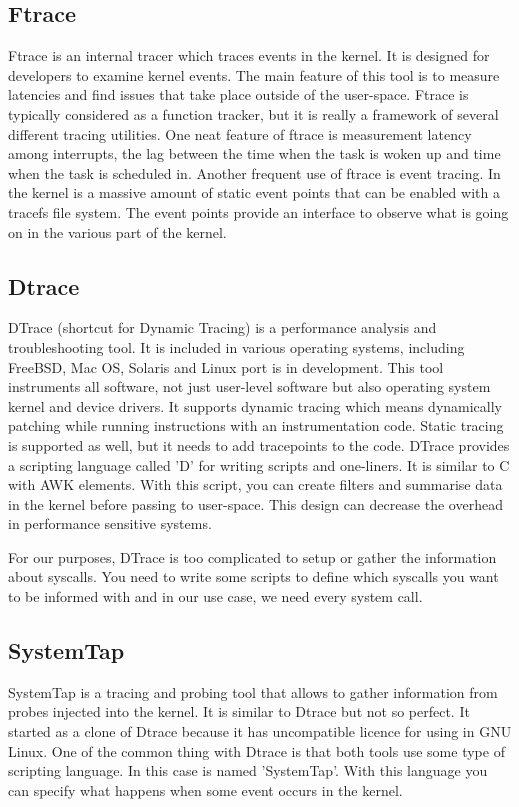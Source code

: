 \subsection{Ftrace}
Ftrace\cite{ftrace_man} is an internal tracer which traces events in the kernel.
It is designed for developers to examine kernel events.
The main feature of this tool is to measure latencies and find issues that take place outside of the user-space.
Ftrace is typically considered as a function tracker,
but it is really a framework of several different tracing utilities.
One neat feature of ftrace is measurement latency among interrupts, the lag between the time when the task is woken up and time when the task is scheduled in.
Another frequent use of ftrace is event tracing.
In the kernel is a massive amount of static event points that can be enabled with a tracefs file system.
The event points provide an interface to observe what is going on in the various part of the kernel.

\subsection{Dtrace}
DTrace\cite{dtrace_man}\cite{dtrace_about} (shortcut for Dynamic Tracing) is a performance analysis and troubleshooting tool.
It is included in various operating systems, including FreeBSD, Mac OS, Solaris and Linux port is in development.
This tool instruments all software, not just user-level software but also operating system kernel and device drivers.
It supports dynamic tracing which means dynamically patching while running instructions with an instrumentation code.
Static tracing is supported as well, but it needs to add tracepoints to the code.
DTrace provides a scripting language called 'D' for writing scripts and one-liners.
It is similar to C with AWK elements.
With this script, you can create filters and summarise data in the kernel before passing to user-space.
This design can decrease the overhead in performance sensitive systems.

For our purposes, DTrace is too complicated to setup or gather the information about syscalls.
You need to write some scripts to define which syscalls you want to be informed with and in our use case, we need every system call.

\subsection{SystemTap}
SystemTap\cite{systemtap} is a tracing and probing tool that allows to gather information from probes injected into the kernel.
It is similar to Dtrace but not so perfect.
It started as a clone of Dtrace because it has uncompatible licence for using in GNU Linux.
One of the common thing with Dtrace is that both tools use some type of scripting language.
In this case is named 'SystemTap'.
With this language you can specify what happens when some event occurs in the kernel.

